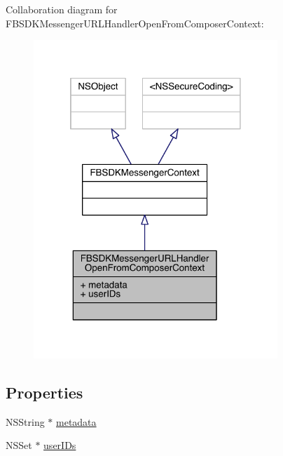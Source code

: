 Collaboration diagram for F\-B\-S\-D\-K\-Messenger\-U\-R\-L\-Handler\-Open\-From\-Composer\-Context\-:
\nopagebreak
\begin{figure}[H]
\begin{center}
\leavevmode
\includegraphics[width=261pt]{interface_f_b_s_d_k_messenger_u_r_l_handler_open_from_composer_context__coll__graph}
\end{center}
\end{figure}
\subsection*{Properties}
\begin{DoxyCompactItemize}
\item 
N\-S\-String $\ast$ \hyperlink{interface_f_b_s_d_k_messenger_u_r_l_handler_open_from_composer_context_ae506afbcd01aff6b1ba765aa865307e2}{metadata}
\item 
N\-S\-Set $\ast$ \hyperlink{interface_f_b_s_d_k_messenger_u_r_l_handler_open_from_composer_context_aec97bc39429cab5358c3020ad5edd125}{user\-I\-Ds}
\end{DoxyCompactItemize}


